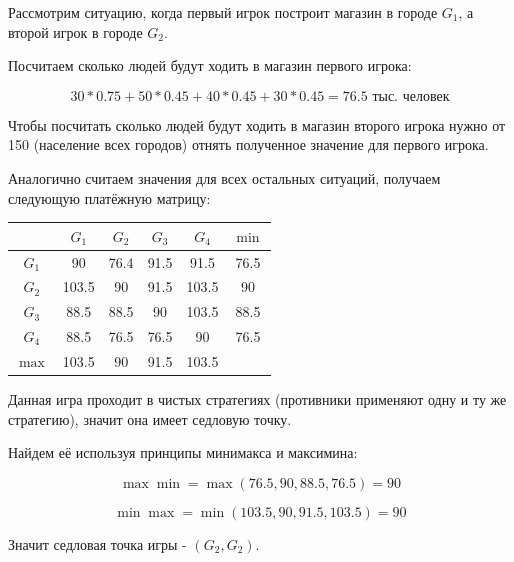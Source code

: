 \documentclass[11pt, a4paper]{article}
\begin{document}
    Рассмотрим ситуацию, когда первый игрок построит магазин в городе $G_1$,
    а второй игрок в городе $G_2$.

    Посчитаем сколько людей будут ходить в магазин первого игрока:

    \begin{equation}
        30 * 0.75 + 50 * 0.45 + 40 * 0.45 + 30 * 0.45 = 76.5\label{eq:equation9}
        \text{ тыс. человек}
    \end{equation}

    Чтобы посчитать сколько людей будут ходить в магазин второго игрока нужно от 150 (население всех городов)
    отнять полученное значение для первого игрока.

    Аналогично считаем значения для всех остальных ситуаций, получаем следующую платёжную матрицу:
    \begin{table}[h]
        \centering
        \begin{tabular}{|c|c|c|c|c|c|}
            \hline        & $G_1$ & $G_2$ & $G_3$ & $G_4$ & $\min$ \\
            \hline $G_1$  & 90    & 76.4  & 91.5  & 91.5  & 76.5   \\
            \hline $G_2$  & 103.5 & 90    & 91.5  & 103.5 & 90     \\
            \hline $G_3$  & 88.5  & 88.5  & 90    & 103.5 & 88.5   \\
            \hline $G_4$  & 88.5  & 76.5  & 76.5  & 90    & 76.5   \\
            \hline $\max$ & 103.5 & 90    & 91.5  & 103.5 &        \\
            \hline
        \end{tabular}\label{tab:table}
    \end{table}

    Данная игра проходит в чистых стратегиях (противники применяют одну и ту же стратегию), значит она имеет седловую точку.

    Найдем её используя принципы минимакса и максимина:

    \begin{equation}
        \max\min = \max(76.5, 90, 88.5, 76.5) = 90\label{eq:equation10}
    \end{equation}

    \begin{equation}
        \min\max = \min(103.5, 90, 91.5, 103.5) = 90\label{eq:equation11}
    \end{equation}

    Значит седловая точка игры - $(G_2, G_2)$.
\end{document}
